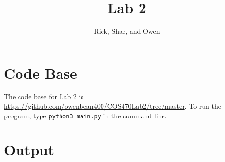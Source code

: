 \documentclass{article}
\title{Lab 2}
\author{Rick, Shae, and Owen}
\begin{document}
\maketitle

\section{Code Base}

The code base for Lab 2 is \href{https://github.com/owenbean400/COS470Lab2/tree/master}{https://github.com/owenbean400/COS470Lab2/tree/master}. To run the program, type \verb|python3 main.py| in the command line.

\section{Output}


\end{document}
